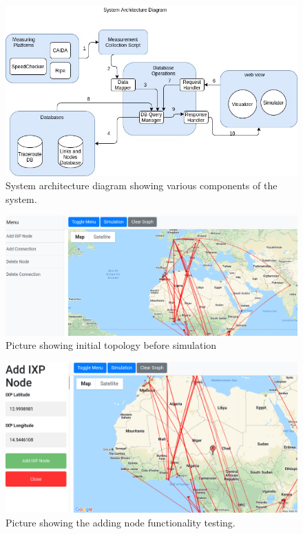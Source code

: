 \appendix
\appendixpage
\begin{figure}
    \begin{center}
        \includegraphics[width=1\linewidth]{sections/pictures-diagrams/system architecture (1).jpg}
    \end{center}
    \caption{ System architecture diagram showing various components of the system.}
    \label{figure:state}
\end{figure}

\begin{figure}
    \begin{center}
        \includegraphics[width=1\linewidth]{sections/pictures-diagrams/original picture.png}
    \end{center}
    \caption{Picture showing initial topology before simulation}
    \label{figure:state}
\end{figure}

\begin{figure}
    \begin{center}
        \includegraphics[width=1\linewidth]{sections/pictures-diagrams/Addnode-picture.png}
    \end{center}
    \caption{Picture showing the adding node functionality testing.}
    \label{figure:state}
\end{figure}

